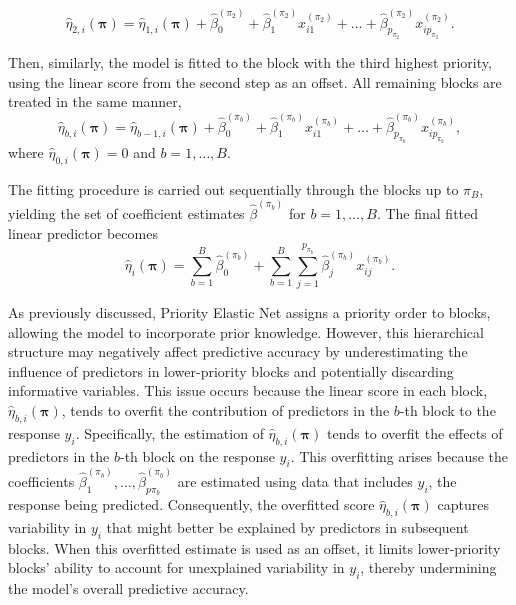 \begin{equation}
\hat{\eta}_{2,i}(\bm{\pi}) =\hat{\eta}_{1,i}(\bm{\pi}) + 
\hat{\beta}_0^{(\pi_2)}+
\hat{\beta}_1^{(\pi_2)}x_{i1}^{(\pi_2)} + . . . + \hat{\beta}_{p_{\pi_2}}^{(\pi_2)}x_{ip_{\pi_2}}^{(\pi_2)}.
\end{equation}

Then, similarly, the model is fitted to the block with the third highest
priority, using the linear score from the second step as an offset. All remaining
blocks are treated in the same manner, 
\begin{equation}
\hat{\eta}_{b,i}(\bm{\pi}) = \hat{\eta}_{b-1,i}(\bm{\pi}) + 
\hat{\beta}_0^{(\pi_b)}+
\hat{\beta}_{ 1}^{(\pi_b)} x_{i1}^{(\pi_b)} + \ldots + \hat{\beta}_{ p_{\pi_b}}^{(\pi_b)} x_{ip_{\pi_b}}^{(\pi_b)},
\end{equation}
where $\hat{\eta}_{0,i}(\bm{\pi}) = 0$ and $b = 1, \ldots, B$.

The fitting procedure is carried out sequentially through the blocks up to $\pi_B$, yielding the set of coefficient estimates $\hat{\beta}^{(\pi_b)}$ for $b = 1, \ldots, B$. The final fitted linear predictor becomes
\begin{equation}
\hat{\eta}_{i}(\bm{\pi}) = 
\sum_{b=1}^{B} 
  \hat{\beta}_0^{(\pi_b)}+
\sum_{b=1}^{B} \sum_{j=1}^{p_{\pi_b}} \hat{\beta}^{(\pi_b)}_j x^{(\pi_b)}_{ij}.
\end{equation}

As previously discussed, Priority Elastic Net assigns a priority order to blocks, allowing the model to incorporate prior knowledge. However, this hierarchical structure may negatively affect predictive accuracy by underestimating the influence of predictors in lower-priority blocks and potentially discarding informative variables. This issue occurs because the linear score in each block, \(\hat{\eta}_{b,i}(\bm{\pi})\), tends to overfit the contribution of predictors in the \(b\)-th block to the response \(y_i\). Specifically, the estimation of $\hat{\eta}_{b,i}(\bm{\pi})$ tends to overfit the effects of predictors in the $b$-th block on the response $y_i$. This overfitting arises because the coefficients $\hat{\beta}_1^{(\pi_b)}, \ldots, \hat{\beta}_{p\pi_b}^{(\pi_b)}$ are estimated using data that includes $y_i$, the response being predicted. Consequently, the overfitted score $\hat{\eta}_{b,i}(\bm{\pi})$ captures variability in $y_i$ that might better be explained by predictors in subsequent blocks. When this overfitted estimate is used as an offset, it limits lower-priority blocks' ability to account for unexplained variability in $y_i$, thereby undermining the model's overall predictive accuracy.

